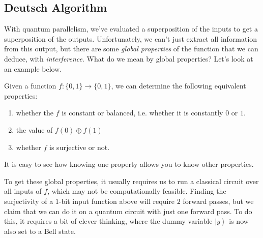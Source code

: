 \documentclass{article}
\newcommand{\ket}[1]{\ensuremath{\left|#1\right\rangle}}
\begin{document}
  \subsection{Deutsch Algorithm}

    With quantum parallelism, we've evaluated a superposition of the inputs to get a superposition of the outputs. Unfortunately, we can't just extract all information from this output, but there are some \textit{global properties} of the function that we can deduce, with \textit{interference}. What do we mean by global properties? Let's look at an example below. 

    \begin{example}
      Given a function $f: \{0, 1\} \longrightarrow \{0, 1\}$, we can determine the following equivalent properties: 
      \begin{enumerate} 
        \item whether the $f$ is constant or balanced, i.e. whether it is constantly $0$ or $1$.
        \item the value of $f(0) \oplus f(1)$
        \item whether $f$ is surjective or not. 
      \end{enumerate}
      It is easy to see how knowing one property allows you to know other properties. 
    \end{example}

    To get these global properties, it usually requires us to run a classical circuit over all inputs of $f$, which may not be computationally feasible. Finding the surjectivity of a $1$-bit input function above will require $2$ forward passes, but we claim that we can do it on a quantum circuit with just one forward pass. To do this, it requires a bit of clever thinking, where the dummy variable $\ket{y}$ is now also set to a Bell state. 
\end{document}
